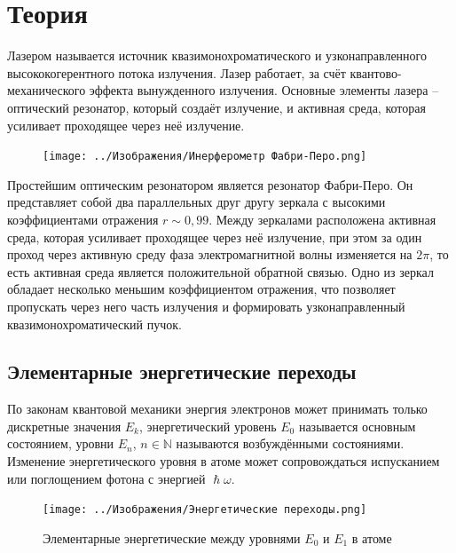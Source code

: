 \section*{Теория}

Лазером называется источник квазимонохроматического и узконаправленного 
высококогерентного потока излучения. Лазер работает, за счёт  
квантово-механического эффекта вынужденного излучения. Основные элементы лазера 
-- оптический резонатор, который создаёт излучение, и активная среда, которая 
усиливает проходящее через неё излучение.

\begin{figure}
	\centering
	\texttt{[image: ../Изображения/Инерферометр 
	Фабри-Перо.png]}
\end{figure}

Простейшим оптическим резонатором является резонатор Фабри-Перо. Он 
представляет собой два параллельных друг другу зеркала с высокими 
коэффициентами отражения $r \sim 0,99$. Между зеркалами расположена активная 
среда, которая усиливает проходящее через неё излучение, при этом за один 
проход через активную среду фаза электромагнитной волны изменяется на $2 \pi$, 
то есть активная среда является положительной обратной связью. Одно из зеркал 
обладает несколько меньшим коэффициентом отражения, что позволяет пропускать 
через него часть излучения и  формировать узконаправленный 
квазимонохроматический пучок.

\subsection*{Элементарные энергетические переходы}

По законам квантовой механики энергия электронов может принимать только 
дискретные значения $E_k$, энергетический уровень $E_0$ называется основным 
состоянием, уровни $E_n$, $n \in \mathbb{N}$ называются возбуждёнными 
состояниями.  Изменение энергетического уровня в атоме может сопровождаться 
испусканием или поглощением фотона с энергией $\hslash \omega$.

\begin{figure}[H]
	\centering
	\texttt{[image: ../Изображения/Энергетические 
	переходы.png]}
	\caption{Элементарные энергетические между уровнями $E_0$ и $E_1$ в атоме}
\end{figure}

